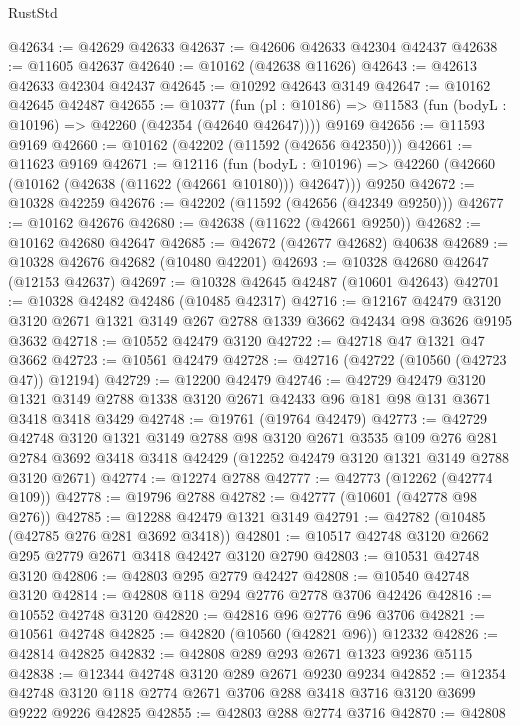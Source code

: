 \begin{lexlean}{RustStd}
\begin{coremodule}
@42634 := @42629 @42633
@42637 := @42606 @42633 @42304 @42437
@42638 := @11605 @42637
@42640 := @10162 (@42638 @11626)
@42643 := @42613 @42633 @42304 @42437
@42645 := @10292 @42643 @3149
@42647 := @10162 @42645 @42487
@42655 := @10377
    (fun (pl : @10186) => @11583 (fun (bodyL : @10196) => @42260 (@42354 (@42640 @42647))))
    @9169
@42656 := @11593 @9169
@42660 := @10162 (@42202 (@11592 (@42656 @42350)))
@42661 := @11623 @9169
@42671 := @12116
    (fun (bodyL : @10196) => @42260 (@42660 (@10162 (@42638 (@11622 (@42661 @10180))) @42647)))
    @9250
@42672 := @10328 @42259
@42676 := @42202 (@11592 (@42656 (@42349 @9250)))
@42677 := @10162 @42676
@42680 := @42638 (@11622 (@42661 @9250))
@42682 := @10162 @42680 @42647
@42685 := @42672 (@42677 @42682) @40638
@42689 := @10328 @42676 @42682 (@10480 @42201)
@42693 := @10328 @42680 @42647 (@12153 @42637)
@42697 := @10328 @42645 @42487 (@10601 @42643)
@42701 := @10328 @42482 @42486 (@10485 @42317)
@42716 := @12167
    @42479
    @3120
    @3120
    @2671
    @1321
    @3149
    @267
    @2788
    @1339
    @3662
    @42434
    @98
    @3626
    @9195
    @3632
@42718 := @10552 @42479 @3120
@42722 := @42718 @47 @1321 @47 @3662
@42723 := @10561 @42479
@42728 := @42716 (@42722 (@10560 (@42723 @47)) @12194)
@42729 := @12200 @42479
@42746 := @42729
    @42479
    @3120
    @1321
    @3149
    @2788
    @1338
    @3120
    @2671
    @42433
    @96
    @181
    @98
    @131
    @3671
    @3418
    @3418
    @3429
@42748 := @19761 (@19764 @42479)
@42773 := @42729
    @42748
    @3120
    @1321
    @3149
    @2788
    @98
    @3120
    @2671
    @3535
    @109
    @276
    @281
    @2784
    @3692
    @3418
    @3418
    @42429
    (@12252 @42479 @3120 @1321 @3149 @2788 @3120 @2671)
@42774 := @12274 @2788
@42777 := @42773 (@12262 (@42774 @109))
@42778 := @19796 @2788
@42782 := @42777 (@10601 (@42778 @98 @276))
@42785 := @12288 @42479 @1321 @3149
@42791 := @42782 (@10485 (@42785 @276 @281 @3692 @3418))
@42801 := @10517 @42748 @3120 @2662 @295 @2779 @2671 @3418 @42427 @3120 @2790
@42803 := @10531 @42748 @3120
@42806 := @42803 @295 @2779 @42427
@42808 := @10540 @42748 @3120
@42814 := @42808 @118 @294 @2776 @2778 @3706 @42426
@42816 := @10552 @42748 @3120
@42820 := @42816 @96 @2776 @96 @3706
@42821 := @10561 @42748
@42825 := @42820 (@10560 (@42821 @96)) @12332
@42826 := @42814 @42825
@42832 := @42808 @289 @293 @2671 @1323 @9236 @5115
@42838 := @12344 @42748 @3120 @289 @2671 @9230 @9234
@42852 := @12354 @42748 @3120 @118 @2774 @2671 @3706 @288 @3418 @3716 @3120 @3699 @9222 @9226 @42825
@42855 := @42803 @288 @2774 @3716
@42870 := @42808

\end{coremodule}
\end{lexlean}
